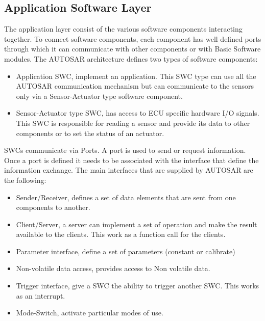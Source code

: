 \documentclass[../main.tex]{subfiles}
\begin{document}
\subsection{Application Software Layer}
The application layer consist of the various software components interacting together. To connect software components, each component has well defined ports through which it can communicate with other components or with Basic Software modules. The \gls{AUTOSAR} architecture defines two types of software components:
\begin{itemize}
    \item Application \gls{SWC}, implement an application. This \gls{SWC} type can use all the \gls{AUTOSAR} communication mechanism but can communicate to the sensors only via a Sensor-Actuator type software component. 
    \item Sensor-Actuator type \gls{SWC}, has access to \gls{ECU} specific hardware \gls{I/O} signals. This \gls{SWC} is responsible for reading a sensor and provide its data to other components or to set the status of an actuator. 
\end{itemize}
\gls{SWC}s communicate via Ports. A port is used to send or request information. Once a port is defined it needs to be associated with the interface that define the information exchange. The main interfaces that are supplied by \gls{AUTOSAR} are the following:
\begin{itemize}
    \item Sender/Receiver, defines a set of data elements that are sent from one components to another. 
    \item Client/Server, a server can implement a set of operation and make the result available to the clients. This work as a function call for the clients. 
    \item Parameter interface, define a set of parameters (constant or calibrate)
    \item Non-volatile data access, provides access to Non volatile data. 
    \item Trigger interface, give a \gls{SWC} the ability to trigger another \gls{SWC}. This works as an interrupt. 
    \item Mode-Switch, activate particular modes of use. 
\end{itemize}
\end{document}
